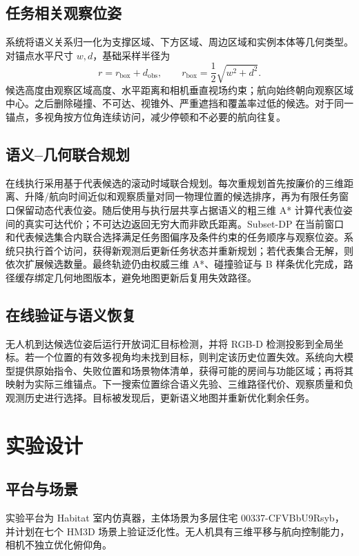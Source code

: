 \documentclass[UTF8,11pt]{ctexart}
\begin{document}
\subsection{任务相关观察位姿}
系统将语义关系归一化为支撑区域、下方区域、周边区域和实例本体等几何类型。对锚点水平尺寸 $w,d$，基础采样半径为
\begin{equation}
r=r_{\mathrm{box}}+d_{\mathrm{obs}},\qquad
r_{\mathrm{box}}=\frac{1}{2}\sqrt{w^2+d^2}.
\end{equation}
候选高度由观察区域高度、水平距离和相机垂直视场约束；航向始终朝向观察区域中心。之后删除碰撞、不可达、视锥外、严重遮挡和覆盖率过低的候选。对于同一锚点，多视角按方位角连续访问，减少停顿和不必要的航向往复。

\subsection{语义--几何联合规划}
在线执行采用基于代表候选的滚动时域联合规划。每次重规划首先按廉价的三维距离、升降/航向时间近似和观察质量对同一物理位置的候选排序，再为有限任务窗口保留动态代表位姿。随后使用与执行层共享占据语义的粗三维 A* 计算代表位姿间的真实可达代价；不可达边返回无穷大而非欧氏距离。Subset-DP 在当前窗口和代表候选集合内联合选择满足任务图偏序及条件约束的任务顺序与观察位姿。系统只执行首个访问，获得新观测后更新任务状态并重新规划；若代表集合无解，则依次扩展候选数量。最终轨迹仍由权威三维 A*、碰撞验证与 B 样条优化完成，路径缓存绑定几何地图版本，避免地图更新后复用失效路径。

\subsection{在线验证与语义恢复}
无人机到达候选位姿后运行开放词汇目标检测，并将 RGB-D 检测投影到全局坐标。若一个位置的有效多视角均未找到目标，则判定该历史位置失效。系统向大模型提供原始指令、失败位置和场景物体清单，获得可能的房间与功能区域；再将其映射为实际三维锚点。下一搜索位置综合语义先验、三维路径代价、观察质量和负观测历史进行选择。目标被发现后，更新语义地图并重新优化剩余任务。

\section{实验设计}
\subsection{平台与场景}
实验平台为 Habitat 室内仿真器，主体场景为多层住宅 00337-CFVBbU9Rsyb，并计划在七个 HM3D 场景上验证泛化性。无人机具有三维平移与航向控制能力，相机不独立优化俯仰角。
\end{document}
